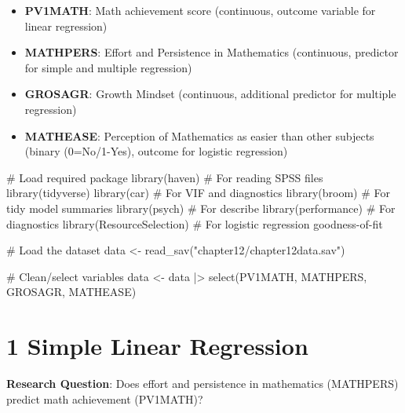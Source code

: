 \documentclass[
  letterpaper,
  DIV=11,
  numbers=noendperiod]{scrreprt}
\newenvironment{Shaded}{\begin{snugshade}}{\end{snugshade}}
\newcommand{\CommentTok}[1]{\textcolor[rgb]{0.37,0.37,0.37}{#1}}
\newcommand{\FunctionTok}[1]{\textcolor[rgb]{0.28,0.35,0.67}{#1}}
\newcommand{\NormalTok}[1]{\textcolor[rgb]{0.00,0.23,0.31}{#1}}
\newcommand{\OtherTok}[1]{\textcolor[rgb]{0.00,0.23,0.31}{#1}}
\newcommand{\SpecialCharTok}[1]{\textcolor[rgb]{0.37,0.37,0.37}{#1}}
\newcommand{\StringTok}[1]{\textcolor[rgb]{0.13,0.47,0.30}{#1}}
\begin{document}
\begin{itemize}
\item
  \textbf{PV1MATH}: Math achievement score (continuous, outcome variable
  for linear regression)
\item
  \textbf{MATHPERS}: Effort and Persistence in Mathematics (continuous,
  predictor for simple and multiple regression)
\item
  \textbf{GROSAGR}: Growth Mindset (continuous, additional predictor for
  multiple regression)
\item
  \textbf{MATHEASE}: Perception of Mathematics as easier than other
  subjects (binary (0=No/1-Yes), outcome for logistic regression)
\end{itemize}

\begin{Shaded}
\begin{Highlighting}[]
\CommentTok{\# Load required package }
\FunctionTok{library}\NormalTok{(haven)       }\CommentTok{\# For reading SPSS files }
\FunctionTok{library}\NormalTok{(tidyverse) }
\FunctionTok{library}\NormalTok{(car)         }\CommentTok{\# For VIF and diagnostics }
\FunctionTok{library}\NormalTok{(broom)       }\CommentTok{\# For tidy model summaries }
\FunctionTok{library}\NormalTok{(psych)       }\CommentTok{\# For describe }
\FunctionTok{library}\NormalTok{(performance) }\CommentTok{\# For diagnostics }
\FunctionTok{library}\NormalTok{(ResourceSelection) }\CommentTok{\# For logistic regression goodness{-}of{-}fit }
 
\CommentTok{\# Load the dataset }
\NormalTok{data }\OtherTok{\textless{}{-}} \FunctionTok{read\_sav}\NormalTok{(}\StringTok{"chapter12/chapter12data.sav"}\NormalTok{) }
 
\CommentTok{\# Clean/select variables }
\NormalTok{data }\OtherTok{\textless{}{-}}\NormalTok{ data }\SpecialCharTok{|\textgreater{}} \FunctionTok{select}\NormalTok{(PV1MATH, MATHPERS, GROSAGR, MATHEASE) }
\end{Highlighting}
\end{Shaded}

\section*{1 Simple Linear Regression}\label{simple-linear-regression}


\textbf{Research Question}: Does effort and persistence in mathematics
(MATHPERS) predict math achievement (PV1MATH)?
\end{document}
